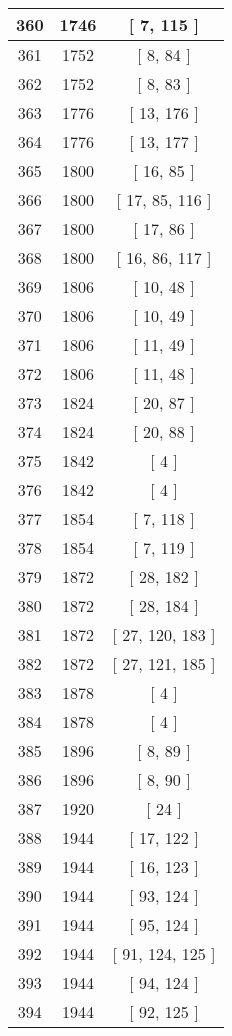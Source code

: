\begin{center}
\begin{longtable}[H]{|| c c c ||}
\hline
360 & 1746 & [ 7, 115 ] \\ 
\hline
361 & 1752 & [ 8, 84 ] \\ 
\hline
362 & 1752 & [ 8, 83 ] \\ 
\hline
363 & 1776 & [ 13, 176 ] \\ 
\hline
364 & 1776 & [ 13, 177 ] \\ 
\hline
365 & 1800 & [ 16, 85 ] \\ 
\hline
366 & 1800 & [ 17, 85, 116 ] \\ 
\hline
367 & 1800 & [ 17, 86 ] \\ 
\hline
368 & 1800 & [ 16, 86, 117 ] \\ 
\hline
369 & 1806 & [ 10, 48 ] \\ 
\hline
370 & 1806 & [ 10, 49 ] \\ 
\hline
371 & 1806 & [ 11, 49 ] \\ 
\hline
372 & 1806 & [ 11, 48 ] \\ 
\hline
373 & 1824 & [ 20, 87 ] \\ 
\hline
374 & 1824 & [ 20, 88 ] \\ 
\hline
375 & 1842 & [ 4 ] \\ 
\hline
376 & 1842 & [ 4 ] \\ 
\hline
377 & 1854 & [ 7, 118 ] \\ 
\hline
378 & 1854 & [ 7, 119 ] \\ 
\hline
379 & 1872 & [ 28, 182 ] \\ 
\hline
380 & 1872 & [ 28, 184 ] \\ 
\hline
381 & 1872 & [ 27, 120, 183 ] \\ 
\hline
382 & 1872 & [ 27, 121, 185 ] \\ 
\hline
383 & 1878 & [ 4 ] \\ 
\hline
384 & 1878 & [ 4 ] \\ 
\hline
385 & 1896 & [ 8, 89 ] \\ 
\hline
386 & 1896 & [ 8, 90 ] \\ 
\hline
387 & 1920 & [ 24 ] \\ 
\hline
388 & 1944 & [ 17, 122 ] \\ 
\hline
389 & 1944 & [ 16, 123 ] \\ 
\hline
390 & 1944 & [ 93, 124 ] \\ 
\hline
391 & 1944 & [ 95, 124 ] \\ 
\hline
392 & 1944 & [ 91, 124, 125 ] \\ 
\hline
393 & 1944 & [ 94, 124 ] \\ 
\hline
394 & 1944 & [ 92, 125 ] \\ 

\end{longtable}
\end{center}

